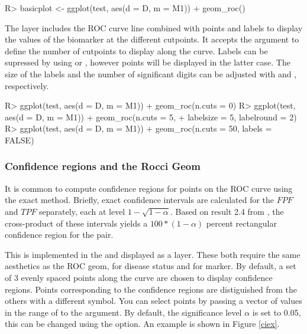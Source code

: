 \documentclass[codesnippet]{jss}
\begin{document}
\begin{Schunk}
\begin{Sinput}
R> basicplot <- ggplot(test, aes(d = D, m = M1)) + geom_roc()
\end{Sinput}
\end{Schunk}

The  layer includes the ROC curve line combined with
points and labels to display the values of the biomarker at the
different cutpoints. It accepts the argument  to define the
number of cutpoints to display along the curve. Labels can be supressed
by using  or , however points will
be displayed in the latter case. The size of the labels and the number
of significant digits can be adjusted with  and
, respectively.

\begin{Schunk}
\begin{Sinput}
R> ggplot(test, aes(d = D, m = M1)) + geom_roc(n.cuts = 0)
R> ggplot(test, aes(d = D, m = M1)) + geom_roc(n.cuts = 5, 
+                                             labelsize = 5, labelround = 2)
R> ggplot(test, aes(d = D, m = M1)) + geom_roc(n.cuts = 50, labels = FALSE)
\end{Sinput}
\end{Schunk}

\subsubsection{Confidence regions and the Rocci
Geom}\label{confidence-regions-and-the-rocci-geom}

It is common to compute confidence regions for points on the ROC curve
using the \citet{clopper1934use} exact method. Briefly, exact confidence
intervals are calculated for the \(FPF\) and \(TPF\) separately, each at
level \(1 - \sqrt{1 - \alpha}\). Based on result 2.4 from
\citet{pepe2003statistical}, the cross-product of these intervals yields
a \(100 * (1 - \alpha)\) percent rectangular confidence region for the
pair.

This is implemented in the  and displayed as a
 layer. These both require the same aesthetics as the
ROC geom,  for disease status and  for marker. By
default, a set of 3 evenly spaced points along the curve are chosen to
display confidence regions. Points corresponding to the confidence
regions are distiguished from the others with a different symbol. You
can select points by passing a vector of values in the range of 
to the  argument. By default, the significance level
\(\alpha\) is set to 0.05, this can be changed using the
 option. An example is shown in Figure \ref{ciex}.
\end{document}
